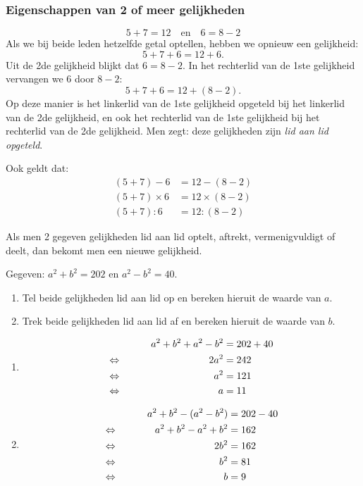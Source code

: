 \documentclass{bis}
\begin{document}
\subsubsection{Eigenschappen van 2 of meer gelijkheden}

\[5+7=12\quad\text{en}\quad6=8-2\]
Als we bij beide leden hetzelfde getal optellen, hebben we opnieuw een gelijkheid:
\[5+7+6=12+6.\]
Uit de 2de gelijkheid blijkt dat $6=8-2$. In het rechterlid van de 1ste gelijkheid vervangen we
6 door $8-2$:
\[5+7+6=12+(8-2).\]
Op deze manier is het linkerlid van de 1ste gelijkheid opgeteld bij het linkerlid van de 2de
gelijkheid, en ook het rechterlid van de 1ste gelijkheid bij het rechterlid van de 2de
gelijkheid. Men zegt: deze gelijkheden zijn \emph{lid aan lid opgeteld}.

Ook geldt dat:
\begin{align*}
(5+7)-6&=12-(8-2)\\
(5+7)\times6&=12\times(8-2)\\
(5+7):6&=12:(8-2)
\end{align*}
\begin{onthoud}
Als men 2 gegeven gelijkheden lid aan lid optelt, aftrekt, vermenigvuldigt of deelt, dan bekomt
men een nieuwe gelijkheid.
\end{onthoud}

\begin{exercise}
Gegeven: $a^2+b^2=202$ en $a^2-b^2=40$.
\begin{enumerate}
  \item Tel beide gelijkheden lid aan lid op en bereken hieruit de waarde van $a$.
  \item Trek beide gelijkheden lid aan lid af en bereken hieruit de waarde van $b$.
\end{enumerate}
\end{exercise}

\begin{solution}
\begin{enumerate}
  \item
  \begin{alignat*}{2}
       &&a^2+b^2+a^2-b^2&=202+40\\
  \Leftrightarrow\mkern40mu &&2a^2&=242\\
  \Leftrightarrow\mkern40mu &&a^2&=121\\
  \Leftrightarrow\mkern40mu &&a&=11
  \end{alignat*}
  \item
  \begin{alignat*}{2}
       &&a^2+b^2-(a^2-b^2)&=202-40\\
  \Leftrightarrow\mkern40mu &&a^2+b^2-a^2+b^2&=162\\
  \Leftrightarrow\mkern40mu &&2b^2&=162\\
  \Leftrightarrow\mkern40mu &&b^2&=81\\
  \Leftrightarrow\mkern40mu &&b&=9
  \end{alignat*}
\end{enumerate}
\end{solution}
\end{document}
